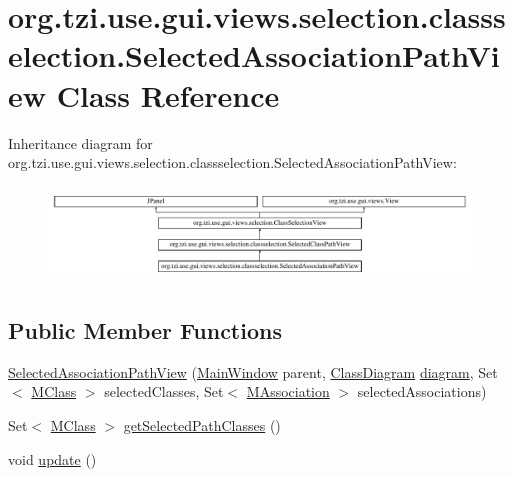 \hypertarget{classorg_1_1tzi_1_1use_1_1gui_1_1views_1_1selection_1_1classselection_1_1_selected_association_path_view}{\section{org.\-tzi.\-use.\-gui.\-views.\-selection.\-classselection.\-Selected\-Association\-Path\-View Class Reference}
\label{classorg_1_1tzi_1_1use_1_1gui_1_1views_1_1selection_1_1classselection_1_1_selected_association_path_view}
}
Inheritance diagram for org.\-tzi.\-use.\-gui.\-views.\-selection.\-classselection.\-Selected\-Association\-Path\-View\-:\begin{figure}[H]
\begin{center}
\leavevmode
\includegraphics[height=2.522522cm]{classorg_1_1tzi_1_1use_1_1gui_1_1views_1_1selection_1_1classselection_1_1_selected_association_path_view}
\end{center}
\end{figure}
\subsection*{Public Member Functions}
\begin{DoxyCompactItemize}
\item 
\hyperlink{classorg_1_1tzi_1_1use_1_1gui_1_1views_1_1selection_1_1classselection_1_1_selected_association_path_view_a6de36fc5c8b4c07a84b44e80149942a7}{Selected\-Association\-Path\-View} (\hyperlink{classorg_1_1tzi_1_1use_1_1gui_1_1main_1_1_main_window}{Main\-Window} parent, \hyperlink{classorg_1_1tzi_1_1use_1_1gui_1_1views_1_1diagrams_1_1classdiagram_1_1_class_diagram}{Class\-Diagram} \hyperlink{classorg_1_1tzi_1_1use_1_1gui_1_1views_1_1selection_1_1_class_selection_view_a8cc2a534904dde3a8f6bebf8c646934d}{diagram}, Set$<$ \hyperlink{interfaceorg_1_1tzi_1_1use_1_1uml_1_1mm_1_1_m_class}{M\-Class} $>$ selected\-Classes, Set$<$ \hyperlink{interfaceorg_1_1tzi_1_1use_1_1uml_1_1mm_1_1_m_association}{M\-Association} $>$ selected\-Associations)
\item 
Set$<$ \hyperlink{interfaceorg_1_1tzi_1_1use_1_1uml_1_1mm_1_1_m_class}{M\-Class} $>$ \hyperlink{classorg_1_1tzi_1_1use_1_1gui_1_1views_1_1selection_1_1classselection_1_1_selected_association_path_view_af273ad2b62ea843e95c55471c0fa297e}{get\-Selected\-Path\-Classes} ()
\item 
void \hyperlink{classorg_1_1tzi_1_1use_1_1gui_1_1views_1_1selection_1_1classselection_1_1_selected_association_path_view_aa5f3f8d705c5d5abe21b6683ec915ea4}{update} ()
\end{DoxyCompactItemize}
